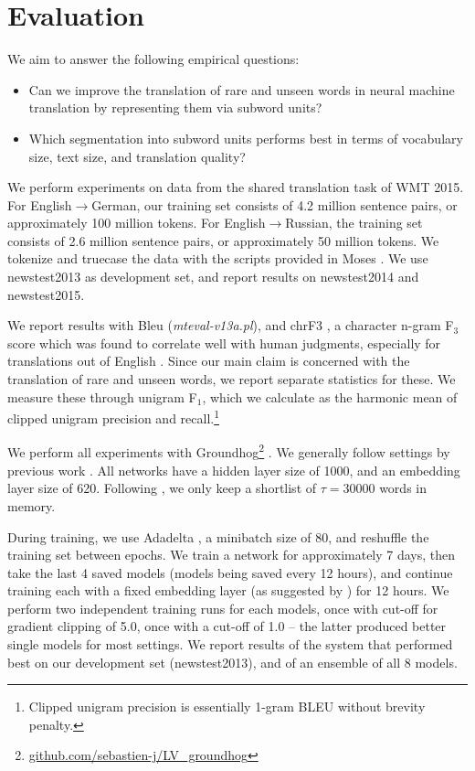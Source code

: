 \documentclass[11pt]{article}
\begin{document}
\section{Evaluation}
\label{sec-eval}

We aim to answer the following empirical questions:

\begin{itemize}
\setlength{\itemsep}{0pt}
\item Can we improve the translation of rare and unseen words in neural machine translation by representing them via subword units?
\item Which segmentation into subword units performs best in terms of vocabulary size, text size, and translation quality?
\end{itemize}

We perform experiments on data from the shared translation task of WMT 2015.
For English$\to$German, our training set consists of 4.2 million sentence pairs, or approximately 100 million tokens.
For English$\to$Russian, the training set consists of 2.6 million sentence pairs, or approximately 50 million tokens.
We tokenize and truecase the data with the scripts provided in Moses \cite{koehnmoses}.
We use newstest2013 as development set, and report results on newstest2014 and newstest2015.

We report results with {\sc Bleu} (\emph{mteval-v13a.pl}),
and {\sc chrF3} \cite{popovic:2015:WMT}, a character n-gram F$_3$ score which was found to correlate well with human judgments, especially for translations out of English \cite{stanojevic-EtAl:2015:WMT}. 
Since our main claim is concerned with the translation of rare and unseen words, we report separate statistics for these.
We measure these through unigram F$_1$, which we calculate as the harmonic mean of clipped unigram precision and recall.\footnote{Clipped unigram precision is essentially 1-gram BLEU without brevity penalty.}

We perform all experiments with Groundhog\footnote{\url{github.com/sebastien-j/LV_groundhog}} \cite{DBLP:journals/corr/BahdanauCB14}.
We generally follow settings by previous work \cite{DBLP:journals/corr/BahdanauCB14,jean15}.
All networks have a hidden layer size of 1000, and an embedding layer size of 620.
Following , we only keep a shortlist of $\tau=30000$ words in memory.

During training, we use Adadelta \cite{DBLP:journals/corr/abs-1212-5701}, a minibatch size of 80, and reshuffle the training set between epochs.
We train a network for approximately 7 days, then take the last 4 saved models (models being saved every 12 hours), and continue training each with a fixed embedding layer (as suggested by \cite{jean15}) for 12 hours.
We perform two independent training runs for each models, once with cut-off for gradient clipping \cite{DBLP:conf/icml/PascanuMB13} of 5.0, once with a cut-off of 1.0 -- the latter produced better single models for most settings.
We report results of the system that performed best on our development set (newstest2013), and of an ensemble of all 8 models.
\end{document}
